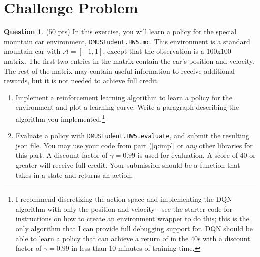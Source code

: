 \documentclass{article}
\theoremstyle{definition}
\newtheorem{question}[thm]{Question}
\begin{document}
\section{Challenge Problem}

\begin{question}
    (50 pts) In this exercise, you will learn a policy for the special mountain car environment, \texttt{DMUStudent.HW5.mc}. This environment is a standard mountain car with $\mathcal{A}=[-1, 1]$, except that the observation is a 100x100 matrix. The first two entries in the matrix contain the car's position and velocity. The rest of the matrix may contain useful information to receive additional rewards, but it is not needed to achieve full credit.
    \begin{enumerate}[label=\alph*)]
        \item Implement a reinforcement learning algorithm to learn a policy for the environment and plot a learning curve. Write a paragraph describing the algorithm you implemented.\footnote{I recommend discretizing the action space and implementing the DQN algorithm with only the position and velocity - see the starter code for instructions on how to create an environment wrapper to do this; this is the only algorithm that I can provide full debugging support for. DQN should be able to learn a policy that can achieve a return of in the 40s with a discount factor of $\gamma=0.99$ in less than 10 minutes of training time.}\label{q:impl}
        \item Evaluate a policy with \texttt{DMUStudent.HW5.evaluate}, and submit the resulting json file. You may use your code from part (\ref{q:impl} or \emph{any} other libraries for this part. A discount factor of $\gamma=0.99$ is used for evaluation. A score of 40 or greater will receive full credit. Your submission should be a function that takes in a state and returns an action.
    \end{enumerate}
\end{question}
\end{document}
